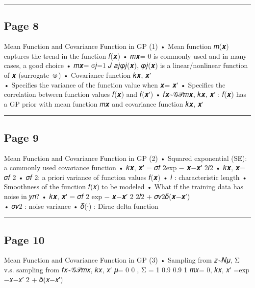 \documentclass[
]{article}
\begin{document}
\begin{center}\rule{0.5\linewidth}{0.5pt}\end{center}

\subsection{Page 8}\label{page-8}

Mean Function and Covariance Function in GP (1) • Mean function 𝑚(𝒙)
captures the trend in the function 𝑓(𝒙) • 𝑚𝒙= 0 is commonly used and in
many cases, a good choice • 𝑚𝒙= σ𝑗=1 𝐽 𝑎𝑗𝜑𝑗(𝒙), 𝜑𝑗(𝒙) is a
linear/nonlinear function of 𝒙 (surrogate ☺) • Covariance function 𝑘𝒙,
𝒙′\\
• Specifies the variance of the function value when 𝒙= 𝒙′ • Specifies
the correlation between function values 𝑓(𝒙) and 𝑓(𝒙′) •
𝑓𝒙\textasciitilde 𝒢𝒫𝑚𝒙, 𝑘𝒙, 𝒙′ : 𝑓(𝒙) has a GP prior with mean function
𝑚𝒙 and covariance function 𝑘𝒙, 𝒙′

\begin{center}\rule{0.5\linewidth}{0.5pt}\end{center}

\subsection{Page 9}\label{page-9}

Mean Function and Covariance Function in GP (2) • Squared exponential
(SE): a commonly used covariance function • 𝑘𝒙, 𝒙′ = 𝜎𝑓 2exp −
\textbar\textbar 𝒙−𝒙′\textbar{} 2𝑙2 • 𝑘𝒙, 𝒙= 𝜎𝑓 2 • 𝜎𝑓 2: a
priori variance of function values 𝑓(𝒙) • 𝑙 : characteristic length •
Smoothness of the function 𝑓(𝑥) to be modeled • What if the training
data has noise in 𝑦𝑛? • 𝑘𝒙, 𝒙′ = 𝜎𝑓 2 exp − 𝒙−𝒙′ 2 2𝑙2 + 𝜎𝑣2𝛿(𝒙−𝒙′)\\
• 𝜎𝑣2 : noise variance • 𝛿(∙) : Dirac delta function

\begin{center}\rule{0.5\linewidth}{0.5pt}\end{center}

\subsection{Page 10}\label{page-10}

Mean Function and Covariance Function in GP (3) • Sampling from
𝑧\textasciitilde 𝑁𝜇, Σ v.s. sampling from 𝑓𝑥\textasciitilde 𝒢𝒫𝑚𝑥, 𝑘𝑥, 𝑥′
𝜇= 0 0 , Σ = 1 0.9 0.9 1 𝑚𝑥= 0, 𝑘𝑥, 𝑥′ =exp −𝑥−𝑥′ 2 + 𝛿(𝑥−𝑥′)
\end{document}
